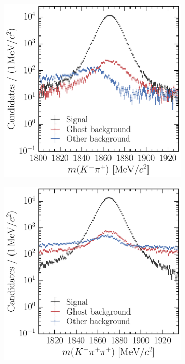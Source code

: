 \begin{figure}
  \begin{subfigure}[b]{0.5\textwidth}
    \centering
    \includegraphics[width=\textwidth]{figures/production/efficiencies/D0ToKpi_BKGCAT}
    \caption{\DzToKpi}
    \label{fig:prod:effs:truth:categories:D0ToKpi}
  \end{subfigure}
  \begin{subfigure}[b]{0.5\textwidth}
    \centering
    \includegraphics[width=\textwidth]{figures/production/efficiencies/DpToKpipi_BKGCAT}

\end{subfigure}
\end{figure}
